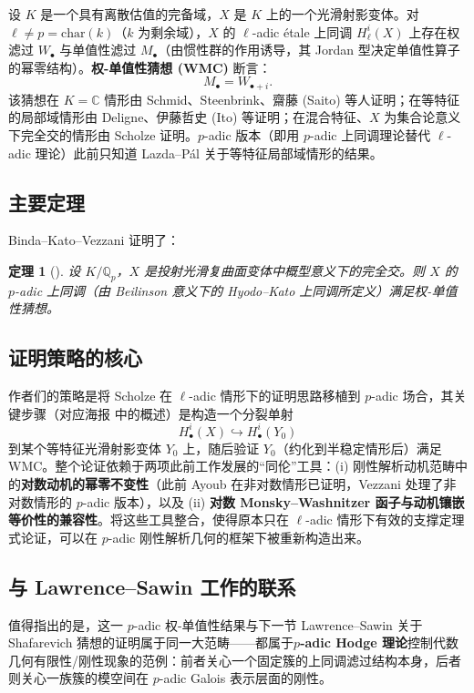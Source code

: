 \documentclass[11pt,a4paper]{article}
\newtheorem{theorem}{定理}[section]
\theoremstyle{definition}
\theoremstyle{remark}
\newcommand{\C}{\mathbb{C}}
\newcommand{\Qp}{\mathbb{Q}_p}
\begin{document}
设 $K$ 是一个具有离散估值的完备域，$X$ 是 $K$ 上的一个光滑射影变体。对 $\ell \ne p = \mathrm{char}(k)$（$k$ 为剩余域），$X$ 的 $\ell$-adic étale 上同调 $H^i_\ell(X)$ 上存在权滤过 $W_\bullet$ 与单值性滤过 $M_\bullet$（由惯性群的作用诱导，其 Jordan 型决定单值性算子的幂零结构）。\textbf{权-单值性猜想 (WMC)} 断言：
\[
M_\bullet = W_{\bullet + i}.
\]
该猜想在 $K = \C$ 情形由 Schmid、Steenbrink、齋藤 (Saito) 等人证明；在等特征的局部域情形由 Deligne、伊藤哲史 (Ito) 等证明；在混合特征、$X$ 为集合论意义下完全交的情形由 Scholze \cite{Scholze2012} 证明。$p$-adic 版本（即用 $p$-adic 上同调理论替代 $\ell$-adic 理论）此前只知道 Lazda--Pál 关于等特征局部域情形的结果。

\subsection{主要定理}

Binda--Kato--Vezzani \cite{BKV2025} 证明了：

\begin{theorem}[\cite{BKV2025}]
设 $K/\Qp$，$X$ 是投射光滑复曲面变体中概型意义下的完全交。则 $X$ 的 $p$-adic 上同调（由 Beilinson 意义下的 Hyodo--Kato 上同调所定义）满足权-单值性猜想。
\end{theorem}

\subsection{证明策略的核心}

作者们的策略是将 Scholze 在 $\ell$-adic 情形下的证明思路移植到 $p$-adic 场合，其关键步骤（对应海报 \cite{Kato2023} 中的概述）是构造一个分裂单射
\[
H^i_\bullet(X) \hookrightarrow H^i_\bullet(Y_0)
\]
到某个等特征光滑射影变体 $Y_0$ 上，随后验证 $Y_0$（约化到半稳定情形后）满足 WMC。整个论证依赖于两项此前工作发展的“同伦”工具：(i) 刚性解析动机范畴中的\textbf{对数动机的幂零不变性}（此前 Ayoub 在非对数情形已证明，Vezzani 处理了非对数情形的 $p$-adic 版本），以及 (ii) \textbf{对数 Monsky--Washnitzer 函子与动机镶嵌等价性的兼容性}。将这些工具整合，使得原本只在 $\ell$-adic 情形下有效的支撑定理式论证，可以在 $p$-adic 刚性解析几何的框架下被重新构造出来。

\subsection{与 Lawrence--Sawin 工作的联系}

值得指出的是，这一 $p$-adic 权-单值性结果与下一节 Lawrence--Sawin 关于 Shafarevich 猜想的证明属于同一大范畴——都属于\textbf{$p$-adic Hodge 理论}控制代数几何有限性/刚性现象的范例：前者关心一个固定簇的上同调滤过结构本身，后者则关心一族簇的模空间在 $p$-adic Galois 表示层面的刚性。
\end{document}
